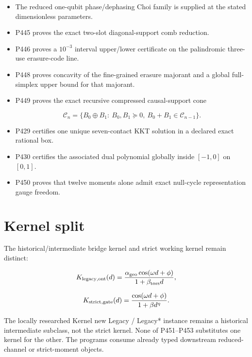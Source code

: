 \documentclass[11pt,a4paper,openany]{report}
\begin{document}
\begin{itemize}
\item 
The reduced one-qubit phase/\allowbreak{}dephasing Choi family is supplied at the stated dimensionless parameters.

\item 
P445 proves the exact two-slot diagonal-support comb reduction.

\item 
P446 proves a \(10^{-3}\) interval upper/\allowbreak{}lower certificate on the palindromic three-use erasure-code line.

\item 
P448 proves concavity of the fine-grained erasure majorant and a global full-simplex upper bound for that majorant.

\item 
P449 proves the exact recursive compressed causal-support cone

\[
  \mathcal C_n=
  \{B_0\oplus B_1:\ B_0,B_1\succeq0,\ B_0+B_1\in\mathcal C_{n-1}\}.
  \]

\item 
P429 certifies one unique seven-contact KKT solution in a declared exact rational box.

\item 
P430 certifies the associated dual polynomial globally inside \([-1,0]\) on \([0,1]\).

\item 
P450 proves that twelve moments alone admit exact null-cycle representation gauge freedom.

\end{itemize}

\section{Kernel split}

The historical/\allowbreak{}intermediate bridge kernel and strict working kernel remain distinct:

\[
K_{\rm legacy,ont}(d)=
\frac{\alpha_{\rm geo}\cos(\omega d+\phi)}{1+\beta_{\rm tors}d},
\]

\[
K_{\rm strict,gate}(d)=
\frac{\cos(\omega d+\phi)}{1+\beta d^\eta}.
\]

The locally researched Kernel new Legacy /\allowbreak{} Legacy* instance remains a historical intermediate subclass, not the strict kernel. None of P451--P453 substitutes one kernel for the other. The programs consume already typed downstream reduced-channel or strict-moment objects.
\end{document}
